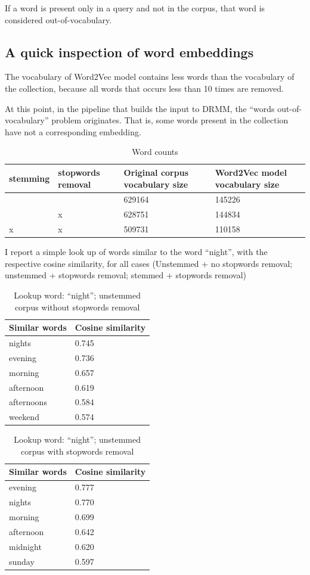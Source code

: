 If a word is present only in a query and not in the corpus, that word is considered out-of-vocabulary.

\subsection{A quick inspection of word embeddings}

The vocabulary of Word2Vec model contains less words than the vocabulary of the collection, because all words that occurs less than 10 times are removed.

At this point, in the pipeline that builds the input to DRMM, the ``words out-of-vocabulary'' problem originates. That is, some words present in the collection have not a corresponding embedding.

\begin{table}[H]
\centering
\begin{tabular}{p{2cm}p{2cm}p{4cm}p{4cm}}
\textbf{stemming} & \textbf{stopwords removal} & \textbf{Original corpus vocabulary size} & \textbf{Word2Vec model vocabulary size} \\ \hline
& & 629164 & 145226 \\
& x & 628751 & 144834 \\
x & x & 509731 & 110158 \\
\end{tabular}
\caption{Word counts}
\end{table}

I report a simple look up of words similar to the word ``night'', with the respective cosine similarity, for all cases (Unstemmed + no stopwords removal; unstemmed + stopwords removal; stemmed + stopwords removal)

\begin{table}[H]
\centering
\begin{tabular}{ll}
\textbf{Similar words} & \textbf{Cosine similarity} \\ \hline  
nights & 0.745 \\
evening & 0.736\\
morning & 0.657 \\
afternoon & 0.619 \\
afternoons & 0.584 \\
weekend & 0.574 \\
\end{tabular}
\caption{Lookup word: ``night''; unstemmed corpus without stopwords removal}
\end{table}

\begin{table}[H]
\centering
\begin{tabular}{ll}
\textbf{Similar words} & \textbf{Cosine similarity} \\ \hline  
evening & 0.777 \\
nights & 0.770 \\
morning & 0.699 \\
afternoon & 0.642 \\
midnight & 0.620 \\
sunday & 0.597 \\
\end{tabular}
\caption{Lookup word: ``night''; unstemmed corpus with stopwords removal}
\end{table}

